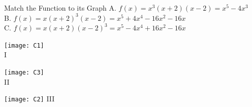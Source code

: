 \begin{frame}[t]{Match the Function to its Graph}\AnswerNo{}
A. $f(x)=x^3(x+2)(x-2)=x^5-4x^3$\\
B. $f(x)=x(x+2)^3(x-2)=x^5+4x^4-16x^2-16x$\\
C. $f(x)=x(x+2)(x-2)^3=x^5-4x^4+16x^2-16x$\\\vfill
\begin{multicols}{2}\centering
\texttt{[image: C1]}\\
\textcolor{C3}{I}\vfill

\texttt{[image: C3]}\\
II\columnbreak

\texttt{[image: C2]}
\textcolor{M5}{III}

\end{multicols}

\end{frame}

